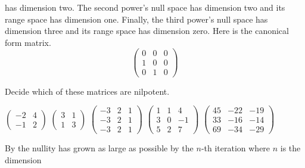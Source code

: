 \begin{exercises}
\begin{answer}
\begin{exparts}
          has dimension two.
          The second power's null space has dimension two and its range space
          has dimension one.
          Finally, the third power's null space has dimension three 
          and its range space
          has dimension zero.
          Here is the canonical form matrix.
          \begin{equation*}
            \begin{pmatrix}
              0  &0  &0  \\
              1  &0  &0  \\
              0  &1  &0 
            \end{pmatrix}
          \end{equation*}
      \end{exparts}
    \end{answer}
  \item 
    Decide which of these matrices are nilpotent.
    \begin{exparts*}
      \partsitem 
        $\begin{pmatrix}
           -2  &4  \\
           -1  &2
        \end{pmatrix}$
      \partsitem 
        $\begin{pmatrix}
          3  &1  \\
          1  &3
        \end{pmatrix}$
      \partsitem 
        $\begin{pmatrix}
          -3  &2  &1  \\
          -3  &2  &1  \\
          -3  &2  &1
        \end{pmatrix}$
      \partsitem 
        $\begin{pmatrix}
           1  &1  &4  \\
           3  &0  &-1 \\
           5  &2  &7
        \end{pmatrix}$
      \partsitem 
        $\begin{pmatrix}
           45  &-22  &-19  \\
           33  &-16  &-14  \\
           69  &-34  &-29
        \end{pmatrix}$
    \end{exparts*}
    \begin{answer}
      By  the nullity has grown as 
      large as possible by the $n$-th iteration where $n$ is the dimension

\end{answer}
\end{exercises}
